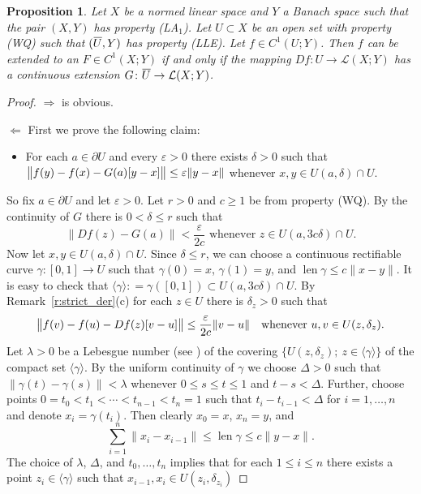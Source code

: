 \documentclass[a4paper,twoside,10pt,reqno,draft]{amsart}
\newtheorem{proposition}[theorem]{Proposition}
\theoremstyle{definition}
\theoremstyle{remark}
\newcommand\setsep{;\allowbreak\ } %
\newcommand\norm[1]{\mathopen\|#1\mathclose\|}
\newcommand\normb[2]{\csname#1l\endcsname\|#2\csname#1r\endcsname\|}
\newcommand{\cl}[2][3]{{}\mkern#1mu\overline{\mkern-#1mu#2}}
\newcommand\ga{\gamma}
\newcommand\de{\delta}
\newcommand\ve{\varepsilon}
\newcommand\bdry{\partial}
\DeclareMathOperator{\len}{len}
\newcommand\lin[2]{\mathcal L(#1;#2)}
\newcommand\eqdef{\mathrel{\mathop:}=}
\newcommand\pLA[1]{(LA$_#1$)}
\newcommand\pLLE{(LLE)}
\newcommand\pWQ{(WQ)}
\begin{document}
\begin{proposition}\label{p:ext_quasi}
Let $X$ be a normed linear space and $Y$ a Banach space such that the pair $(X,Y)$ has property \pLA1.
Let $U\subset X$ be an open set with property {\pWQ} such that $(\cl[1]U,Y)$ has property \pLLE.
Let $f\in C^1(U;Y)$.
Then $f$ can be extended to an $F\in C^1(X;Y)$ if and only if the mapping $Df\colon U\to\lin XY$ has a continuous extension $G\colon\cl[1]U\to\lin XY$.
\end{proposition}
\begin{proof}
$\Rightarrow$ is obvious.

$\Leftarrow$
First we prove the following claim:
\begin{itemize}
\item[($*$)] For each $a\in\bdry U$ and every $\ve>0$ there exists $\de>0$ such that $\normb{big}{f(y)-f(x)-G(a)[y-x]}\le\ve\norm{y-x}$ whenever $x,y\in U(a,\de)\cap U$.
\end{itemize}
So fix $a\in\bdry U$ and let $\ve>0$.
Let $r>0$ and $c\ge1$ be from property {\pWQ}.
By the continuity of $G$ there is $0<\de\le r$ such that
\begin{equation}\label{e:wq-G}
\text{$\norm{Df(z)-G(a)}<\frac\ve{2c}$ whenever $z\in U(a,3c\de)\cap U$.}
\end{equation}
Now let $x,y\in U(a,\de)\cap U$.
Since $\de\le r$, we can choose a continuous rectifiable curve $\ga\colon[0,1]\to U$ such that $\ga(0)=x$, $\ga(1)=y$, and $\len\ga\le c\norm{x-y}$.
It is easy to check that $\langle\ga\rangle\eqdef\gamma([0,1])\subset U(a,3c\de)\cap U$.
By Remark~\ref{r:strict_der}(c) for each $z\in U$ there is $\de_z>0$ such that
\begin{equation}\label{e:wq-strict}
\normb{big}{f(v)-f(u)-Df(z)[v-u]}\le\frac\ve{2c}\norm{v-u}\quad\text{whenever $u,v\in U(z,\de_z)$.}
\end{equation}
Let $\lambda>0$ be a Lebesgue number (see \cite[p.~276]{Engelking}) of the covering $\{U(z,\de_z)\setsep z\in\langle\ga\rangle\}$ of the compact set $\langle\ga\rangle$.
By the uniform continuity of $\ga$ we choose $\Delta>0$ such that $\norm{\ga(t)-\ga(s)}<\lambda$ whenever $0\le s\le t\le1$ and $t-s<\Delta$.
Further, choose points $0=t_0<t_1<\dotsb<t_{n-1}<t_n=1$ such that $t_i-t_{i-1}<\Delta$ for $i=1,\dotsc,n$ and denote $x_i=\ga(t_i)$.
Then clearly $x_0=x$, $x_n=y$, and
\begin{equation}\label{e:wq-blizko}
\sum_{i=1}^n\norm{x_i-x_{i-1}}\le\len\ga\le c\norm{y-x}.
\end{equation}
The choice of $\lambda$, $\Delta$, and $t_0,\dotsc,t_n$ implies that for each $1\le i\le n$ there exists a point $z_i\in\langle\ga\rangle$ such that $x_{i-1},x_i\in U(z_i,\de_{z_i})$

\end{proof}
\end{document}
